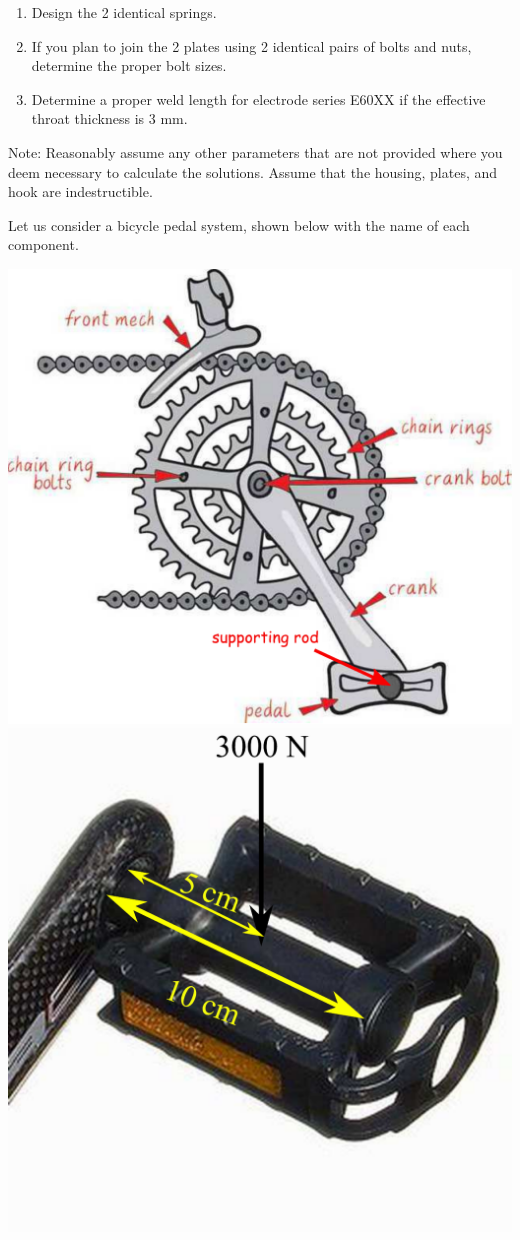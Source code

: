 \documentclass[
10pt,
a4paper,
openany,
svgnames,
]{book}
\newcommand{\exercise}{%
\item \label{lab:\arabic{chapter}-\arabic{exercisesi}}  %
}
\begin{document}
\begin{exercises}
  \begin{enumerate}
  \item Design the 2 identical springs.
  \item If you plan to join the 2 plates using 2 identical pairs of bolts and nuts, determine the proper bolt sizes.
  \item Determine a proper weld length for electrode series E60XX if the effective throat thickness is 3 mm.
  \end{enumerate}
  Note: Reasonably assume any other parameters that are not provided where you deem necessary to calculate the solutions. Assume that the housing, plates, and hook are indestructible.
  
  \exercise Let us consider a bicycle pedal system, shown below with the name of each component.
  \begin{center}
    \includegraphics[scale=0.44]{pictures/Machine-interaction/pedal-system}
    \includegraphics[scale=0.3]{pictures/Machine-interaction/pedal}

\end{center}
\end{exercises}
\end{document}
